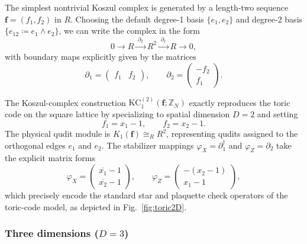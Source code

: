 \documentclass[aps,prx,english,superscriptaddress,twocolumn,tightenlines,showpacs,longbibliography,floatfix,amsfonts]{revtex4-2}
\theoremstyle{remark}
\theoremstyle{definition}
\begin{document}
The simplest nontrivial Koszul complex is generated by a length-two sequence $\mathbf{f}=(f_1, f_2)$ in $R$. Choosing the default degree-1 basis $\{e_1, e_2\}$ and degree-2 basis $\{e_{12} \coloneqq e_1 \wedge e_2\}$, we can write the complex in the form
\begin{equation}
	0 \longrightarrow R \xrightarrow{\;\partial_2\;} R^2 \xrightarrow{\;\partial_1\;} R \longrightarrow 0,
	\label{eq:2d-toric-koszul}
\end{equation}
with boundary maps explicitly given by the matrices
\begin{equation}
	\partial_1=
	\begin{pmatrix} f_1 & f_2 \end{pmatrix}, \qquad \partial_2= \begin{pmatrix} -f_2\\ f_1
	\end{pmatrix}. \label{eq:KC2}
\end{equation}

The Koszul-complex construction $\mathrm{KC}_1^{(2)}(\mathbf{f};\mathbb{Z}_N)$ exactly reproduces the toric code on the square lattice by specializing to spatial dimension $D=2$ and setting
\begin{equation}
	f_1=x_1-1, \qquad f_2=x_2-1.
\end{equation}
The physical qudit module is $K_1(\mathbf{f})\cong_R R^2$, representing qudits assigned to the orthogonal edges $e_1$ and $e_2$. The stabilizer mappings $\varphi_X=\partial_1^\dagger$ and $\varphi_Z=\partial_2$ take the explicit matrix forms
\begin{equation}
	\varphi_X = \begin{pmatrix} \overline{x_1}-1 \\ \overline{x_2}-1 \end{pmatrix}, \qquad \varphi_Z = \begin{pmatrix} -(x_2-1) \\ x_1-1 \end{pmatrix},
\end{equation}
which precisely encode the standard star and plaquette check operators of the toric-code model, as depicted in Fig.~\ref{fig:toric2D}.

\subsubsection{Three dimensions ($D=3$)}
\end{document}
